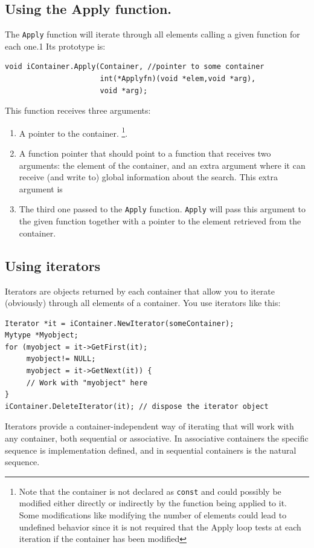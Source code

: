 \documentclass[12pt,a4paper]{memoir} %
\begin{document}
\subsection{Using the Apply function.}
The \verb,Apply, function will iterate through all elements calling a given function for each one.1 Its prototype is:
\begin{verbatim}
void iContainer.Apply(Container, //pointer to some container
                      int(*Applyfn)(void *elem,void *arg),
                      void *arg);
\end{verbatim}
This function receives three arguments:
\begin{enumerate}
\item A pointer to the container. \footnote{Note that the container is not declared as \texttt{const} and could possibly be modified either directly or 
indirectly by the function being applied to it. Some modifications like modifying the number of elements could lead to undefined behavior since it
is not required that the Apply loop tests at each iteration if the container has been modified}.
\item A function pointer that should point to a function that receives two arguments: the element of the container, and an extra argument where it can 
receive (and write to) global information about the search.  This extra argument is 
\item The third one passed to the \verb,Apply, function. \verb,Apply, will pass this argument to the given function together with a pointer to the 
element retrieved from the container.
\end{enumerate}
\subsection{Using iterators}
Iterators are objects returned by each container that allow you to iterate (obviously) through all elements of a container.
You use iterators like this:
\begin{verbatim}
Iterator *it = iContainer.NewIterator(someContainer);
Mytype *Myobject;
for (myobject = it->GetFirst(it); 
     myobject!= NULL; 
     myobject = it->GetNext(it)) {
     // Work with "myobject" here
}
iContainer.DeleteIterator(it); // dispose the iterator object
\end{verbatim}
Iterators provide a container-independent way of iterating that will work with any container, both sequential or associative. In associative containers 
the specific sequence is implementation defined, and in sequential containers is the natural sequence.
\end{document}
